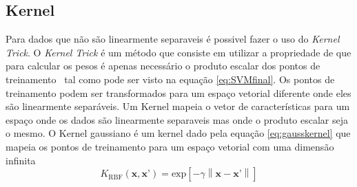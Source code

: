 \subsection{Kernel}
Para dados que n\~ao s\~ao linearmente separaveis \'e possivel fazer o uso do \textit{Kernel Trick}.
O \textit{Kernel Trick} \'e um m\'etodo que consiste em utilizar a propriedade de que para calcular os pesos \'e apenas necessário o produto escalar dos pontos de treinamento \ tal como pode ser visto na equa\c{c}\~ao \ref{eq:SVMfinal}.
Os pontos de treinamento podem ser transformados para um espa\c{c}o vetorial diferente onde eles s\~ao linearmente separáveis.
Um Kernel mapeia o vetor de características para um espa\c{c}o onde os dados s\~ao linearmente separaveis mas onde o produto escalar seja o mesmo.
O Kernel gaussiano \'e um kernel dado pela equa\c{c}\~ao \ref{eq:gausskernel} que mapeia os pontos de treinamento para um espa\c{c}o vetorial com uma dimens\~ao infinita 
\begin{equation}\label{eq:gausskernel}
K_{\text{RBF}}\left( \textbf{x},\textbf{x'} \right) = \text{exp} \left[ -\gamma \left\|  \textbf{x} - \textbf{x'} \right\| \right]  	
\end{equation}
%
%
%		
%		

